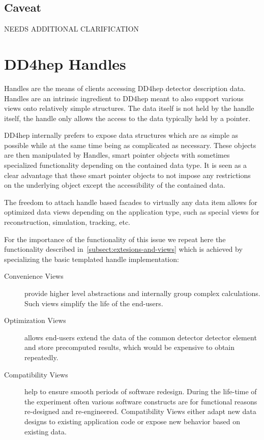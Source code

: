 \subsection{Caveat}
\label{sec:dd4hep-user-manual-caveat}
NEEDS ADDITIONAL CLARIFICATION

\section{DD4hep Handles}
\label{sec:dd4hep-user-manual-handles}

Handles are the means of clients accessing DD4hep detector description data. Handles are an intrinsic ingredient to DD4hep meant to also support various views onto relatively simple structures. The data itself is not held by the handle itself, the handle only allows the access to the data typically held by a pointer.

DD4hep internally prefers to expose data structures which are as simple as possible while at the same time being as complicated as necessary. These objects are then manipulated by Handles, smart pointer objects with sometimes specialized functionality depending on the contained data type. It is seen as a clear advantage that these smart pointer objects to not impose any restrictions on the underlying object except the accessibility of the contained data.

The freedom to attach handle based facades to virtually any data item allows for optimized data views depending on the application type, such as special views for reconstruction, simulation, tracking, etc.

For the importance of the functionality of this issue we repeat here the functionality described in~\ref{subsect:extesions-and-views} which is achieved by specializing the basic templated handle implementation:
\begin{description}
\item [Convenience Views] provide higher level abstractions and internally group complex calculations. Such views simplify the life of the end-users.
\item [Optimization Views] allows end-users extend the data of the common detector detector element and store precomputed results, which would be expensive to obtain repeatedly.
\item [Compatibility Views] help to ensure smooth periods of software redesign. During the life-time of the experiment often various software constructs are for functional reasons re-designed and re-engineered. Compatibility Views either adapt new data designs to existing application code or expose new behavior based on existing data.
\end{description}

